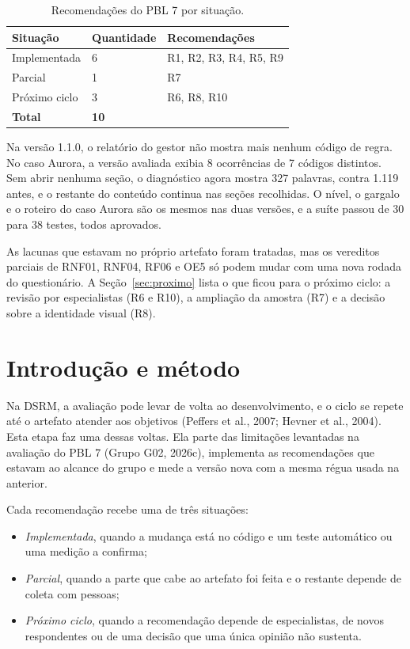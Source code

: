 \documentclass[11pt,a4paper]{article}
\newcommand{\rotulo}[1]{\par\needspace{3\baselineskip}\vspace{0.4em}{\sffamily\bfseries #1}\par\nopagebreak\vspace{-0.4em}}
\newcommand{\paginacaocorpo}{\fancyfoot[C]{\sffamily\footnotesize\thepage{} de \pageref*{LastPage}}}
\newcommand{\thead}[1]{\sffamily\bfseries\small #1}
\begin{document}
\begin{table}[H]
\centering\small
\caption{Recomendações do PBL 7 por situação.}
\begin{tabularx}{\linewidth}{L{3.2cm}L{2.4cm}X}
\toprule
\thead{Situação} & \thead{Quantidade} & \thead{Recomendações} \\
\midrule
Implementada & 6 & R1, R2, R3, R4, R5, R9 \\
Parcial & 1 & R7 \\
Próximo ciclo & 3 & R6, R8, R10 \\
\textbf{Total} & \textbf{10} &  \\
\bottomrule
\end{tabularx}
\end{table}

\rotulo{Principais achados}
Na versão 1.1.0, o relatório do gestor não mostra mais nenhum código de regra. No caso Aurora, a versão avaliada
exibia 8 ocorrências de 7 códigos distintos. Sem abrir nenhuma seção, o diagnóstico agora mostra 327 palavras, contra 1.119 antes, e o
restante do conteúdo continua nas seções recolhidas. O nível, o gargalo e o roteiro do caso Aurora são os mesmos nas
duas versões, e a suíte passou de 30 para 38 testes, todos aprovados.

\rotulo{Próximos passos}
As lacunas que estavam no próprio artefato foram tratadas, mas os vereditos parciais de RNF01, RNF04, RF06 e OE5 só
podem mudar com uma nova rodada do questionário. A Seção~\ref{sec:proximo} lista o que ficou para o próximo ciclo: a
revisão por especialistas (R6 e R10), a ampliação da amostra (R7) e a decisão sobre a identidade visual (R8).

\clearpage
\tableofcontents
\clearpage
{}
\paginacaocorpo

\section{Introdução e método}
Na DSRM, a avaliação pode levar de volta ao desenvolvimento, e o ciclo se repete até o artefato atender aos objetivos
(Peffers et al., 2007; Hevner et al., 2004). Esta etapa faz uma dessas voltas. Ela parte das limitações levantadas na
avaliação do PBL 7 (Grupo G02, 2026c), implementa as recomendações que estavam ao alcance do grupo e mede a versão
nova com a mesma régua usada na anterior.

Cada recomendação recebe uma de três situações:
\begin{itemize}
  \item \emph{Implementada}, quando a mudança está no código e um teste automático ou uma medição a confirma;
  \item \emph{Parcial}, quando a parte que cabe ao artefato foi feita e o restante depende de coleta com pessoas;
  \item \emph{Próximo ciclo}, quando a recomendação depende de especialistas, de novos respondentes ou de uma decisão
        que uma única opinião não sustenta.
\end{itemize}
\end{document}
